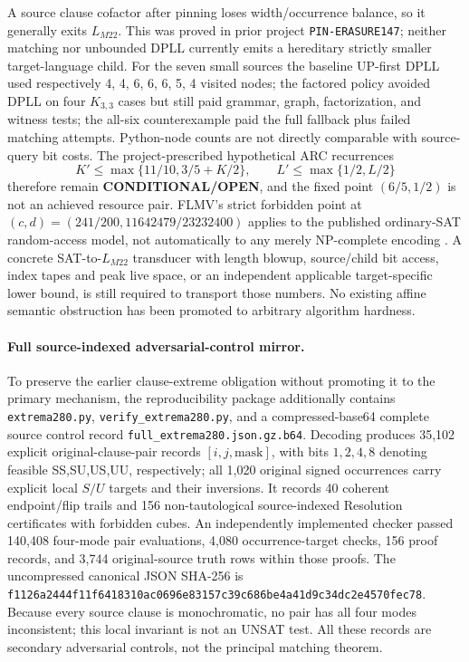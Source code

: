\documentclass[11pt]{article}
\begin{document}
A source clause cofactor after pinning loses width/occurrence balance, so it generally exits $L_{M22}$. This was proved in prior project \texttt{PIN-ERASURE147}; neither matching nor unbounded DPLL currently emits a hereditary strictly smaller target-language child. For the seven small sources the baseline UP-first DPLL used respectively 4, 4, 6, 6, 6, 5, 4 visited nodes; the factored policy avoided DPLL on four $K_{3,3}$ cases but still paid grammar, graph, factorization, and witness tests; the all-six counterexample paid the full fallback plus failed matching attempts. Python-node counts are not directly comparable with source-query bit costs. The project-prescribed hypothetical ARC recurrences
\[
K'\le\max\{11/10,3/5+K/2\},\qquad L'\le\max\{1/2,L/2\}
\]
therefore remain \textbf{CONDITIONAL/OPEN}, and the fixed point $(6/5,1/2)$ is not an achieved resource pair. FLMV's strict forbidden point at $(c,d)=(241/200,11642479/23232400)$ applies to the published ordinary-SAT random-access model, not automatically to any merely NP-complete encoding \cite{flmv}. A concrete SAT-to-$L_{M22}$ transducer with length blowup, source/child bit access, index tapes and peak live space, or an independent applicable target-specific lower bound, is still required to transport those numbers. No existing affine semantic obstruction has been promoted to arbitrary algorithm hardness.

\paragraph{Full source-indexed adversarial-control mirror.}
To preserve the earlier clause-extreme obligation without promoting it to the primary mechanism, the reproducibility package additionally contains \texttt{extrema280.py}, \texttt{verify\_extrema280.py}, and a compressed-base64 complete source control record \texttt{full\_extrema280.json.gz.b64}. Decoding produces 35,102 explicit original-clause-pair records $[i,j,\mathrm{mask}]$, with bits $1,2,4,8$ denoting feasible SS,SU,US,UU, respectively; all 1,020 original signed occurrences carry explicit local $S/U$ targets and their inversions. It records 40 coherent endpoint/flip trails and 156 non-tautological source-indexed Resolution certificates with forbidden cubes. An independently implemented checker passed 140,408 four-mode pair evaluations, 4,080 occurrence-target checks, 156 proof records, and 3,744 original-source truth rows within those proofs. The uncompressed canonical JSON SHA-256 is \texttt{f1126a2444f11f6418310ac0696e83157c39c686be4a41d9c34dc2e4570fec78}. Because every source clause is monochromatic, no pair has all four modes inconsistent; this local invariant is not an UNSAT test. All these records are secondary adversarial controls, not the principal matching theorem.
\end{document}
